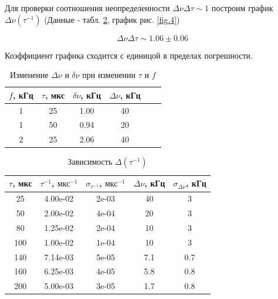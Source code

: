 \documentclass{article}
\begin{document}
   Для проверки соотношения неопределенности $\Delta\nu \Delta\tau \sim 1$ построим график $\Delta\nu(\tau^{-1})$ (Данные - табл. \ref{undefined}, график рис. \ref{fig.4})

   $$ \Delta \nu \Delta \tau \sim 1.06 \pm 0.06 $$

   Коэффициент графика сходится с единицой в пределах погрешности.

   \begin{table}[h!]
   \begin{center}
   \caption{Изменение $\Delta \nu$ и $\delta \nu$ при изменении $\tau$ и $f$}
   \label{Ddtf}
   \begin{tabular}{|*{6}{c|}}
   \hline 
   $f$, кГц & $\tau$, мкс & $\delta \nu$, кГц & $\Delta \nu$, кГц \\ \hline 
   1 & 25 & 1.00 & 40 \\ \hline 
   1 & 50 & 0.94 & 20 \\ \hline 
   2 & 25 & 2.06 & 40 \\ \hline 
   \end{tabular}
   \end{center} 
   \end{table}

   \begin{table}[h!]
   \begin{center}
   \label{undefined}
   \caption{Зависимость $\Delta(\tau^{-1})$}
   \begin{tabular}{|*{5}{c|}}
   \hline 
   $\tau$, мкс & $\tau^{-1}$, $\text{мкс}^{-1}$ & $\sigma_{\tau^{-1}}$, $\text{мкс}^{-1}$ & $\Delta \nu$, кГц & $\sigma_{\Delta \nu}$, кГц \\ \hline 
   25 & 4.00e-02 & 2e-03 & 40 & 3 \\ \hline 
   50 & 2.00e-02 & 4e-04 & 20 & 3 \\ \hline 
   80 & 1.25e-02 & 2e-04 & 10 & 3 \\ \hline 
   100 & 1.00e-02 & 1e-04 & 10 & 3 \\ \hline 
   140 & 7.14e-03 & 5e-05 & 7.1 & 0.7 \\ \hline 
   160 & 6.25e-03 & 4e-05 & 5.8 & 0.8 \\ \hline 
   200 & 5.00e-03 & 3e-05 & 1.7 & 0.8 \\ \hline 
   \end{tabular}
   \end{center} 
   \end{table} 
\end{document}
